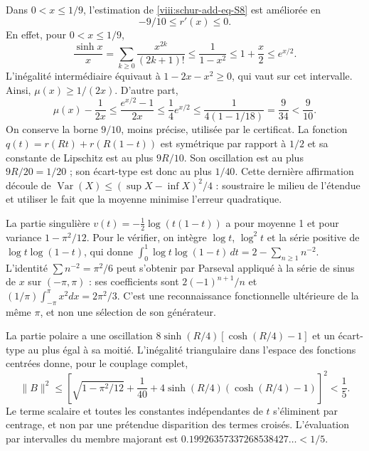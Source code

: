 Dans \(0<x\leq1/9\), l'estimation de \eqref{viii:schur-add-eq-S8} est améliorée en
\begin{equation}
-9/10\leq r'(x)\leq0.
\label{viii:schur-add-display-25}
\end{equation}
En effet, pour \(0<x\leq1/9\),
\begin{equation}
\frac{\sinh x}{x}
=\sum_{k\geq0}\frac{x^{2k}}{(2k+1)!}
\leq\frac1{1-x^2}\leq1+\frac x2\leq e^{x/2}.
\label{viii:schur-add-display-26}
\end{equation}
L'inégalité intermédiaire équivaut à \(1-2x-x^2\geq0\),
qui vaut sur cet intervalle. Ainsi, \(\mu(x)\geq1/(2x)\).
D'autre part,
\begin{equation}
\mu(x)-\frac1{2x}\leq\frac{e^{x/2}-1}{2x}
\leq\frac14 e^{x/2}
\leq\frac1{4(1-1/18)}=\frac9{34}<\frac9{10}.
\label{viii:schur-add-display-27}
\end{equation}
On conserve la borne \(9/10\), moins précise, utilisée par le certificat.
La fonction \(q(t)=r(Rt)+r(R(1-t))\) est symétrique par rapport à
\(1/2\) et sa constante de Lipschitz est au plus \(9R/10\).
Son oscillation est au plus \(9R/20=1/20\) ; son écart-type
est donc au plus \(1/40\). Cette dernière affirmation découle de
\(\operatorname{Var}(X)\leq(\sup X-\inf X)^2/4\) : soustraire le
milieu de l'étendue et utiliser le fait que la moyenne minimise l'erreur quadratique.

La partie singulière \(v(t)=-\tfrac12\log(t(1-t))\) a pour moyenne 1 et pour variance \(1-\pi^2/12\). Pour le vérifier, on intègre \(\log t\), \(\log^2t\) et la série positive de \(\log t\log(1-t)\), qui donne \(\int_0^1\log t\log(1-t)\,dt=2-\sum_{n\geq1}n^{-2}\). L'identité \(\sum n^{-2}=\pi^2/6\) peut s'obtenir par Parseval appliqué à la série de sinus de \(x\) sur \((-\pi,\pi)\) : ses coefficients sont \(2(-1)^{n+1}/n\) et \((1/\pi)\int_{-\pi}^{\pi}x^2dx=2\pi^2/3\). C'est une reconnaissance fonctionnelle ultérieure de la même \(\pi\), et non une sélection de son générateur.

La partie polaire a une oscillation
\(8\sinh(R/4)[\cosh(R/4)-1]\) et un écart-type au plus égal à
sa moitié. L'inégalité triangulaire dans l'espace des fonctions
centrées donne, pour le couplage complet,
\begin{equation}
\boxed{\|B\|^2\leq
\left[\sqrt{1-\pi^2/12}+\frac1{40}
+4\sinh(R/4)(\cosh(R/4)-1)\right]^2<\frac15.}
\label{viii:schur-add-eq-S12}
\end{equation}
Le terme scalaire et toutes les constantes indépendantes de \(t\)
s'éliminent par centrage, et non par une prétendue disparition des
termes croisés. L'évaluation par intervalles du membre majorant est
\(0.19926357337268538427\ldots<1/5\).


